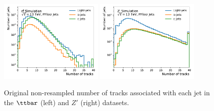 \begin{figure}
    \centering
    \includegraphics[width=0.45\textwidth]{figures/flavour_tagging/ttbar_2.pdf}
    \includegraphics[width=0.45\textwidth]{figures/flavour_tagging/zprime_2.pdf}
    \caption{Original non-resampled number of tracks associated with each jet in the $\ttbar$ (left) and $Z'$ (right) datasets.}
    \label{fig:track_multiplicity}
\end{figure}

